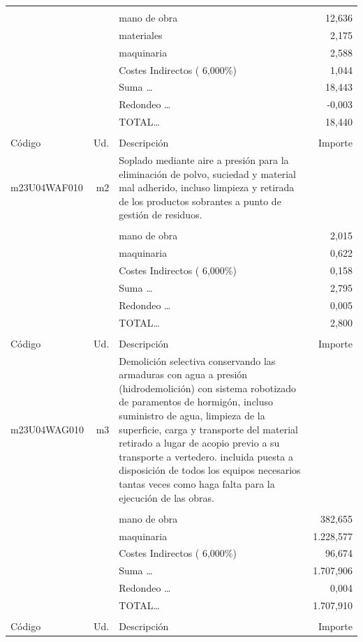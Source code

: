 \begin{supertabular}{l r p{60mm} r}
&&&\\%
&&mano de obra&    12,636\\%
&&materiales&     2,175\\%
&&maquinaria&     2,588\\%
&&Costes Indirectos (     6,000\%)&     1,044\\%
&&Suma \ldots&    18,443\\%
&&Redondeo \ldots&    {-}0,003\\%
%
&&TOTAL\ldots&    18,440\\%
&&&\\%
Código&Ud.&Descripción&Importe\\%
\hline%
m23U04WAF010&m2&Soplado mediante aire a presión para la eliminación de polvo, suciedad y material mal adherido, incluso limpieza y retirada de los productos sobrantes a punto de gestión de residuos.&\\%
&&&\\%
&&mano de obra&     2,015\\%
&&maquinaria&     0,622\\%
&&Costes Indirectos (     6,000\%)&     0,158\\%
&&Suma \ldots&     2,795\\%
&&Redondeo \ldots&     0,005\\%
%
&&TOTAL\ldots&     2,800\\%
&&&\\%
Código&Ud.&Descripción&Importe\\%
\hline%
m23U04WAG010&m3&Demolición selectiva conservando las armaduras con agua a presión (hidrodemolición) con sistema robotizado de paramentos de hormigón, incluso suministro de agua, limpieza de la superficie, carga y transporte del material retirado a lugar de acopio previo a su transporte a vertedero. incluida puesta a disposición de todos los equipos necesarios tantas veces como haga falta para la ejecución de las obras.&\\%
&&&\\%
&&mano de obra&   382,655\\%
&&maquinaria& 1.228,577\\%
&&Costes Indirectos (     6,000\%)&    96,674\\%
&&Suma \ldots& 1.707,906\\%
&&Redondeo \ldots&     0,004\\%
%
&&TOTAL\ldots& 1.707,910\\%
&&&\\%
Código&Ud.&Descripción&Importe\\%

\end{supertabular}
